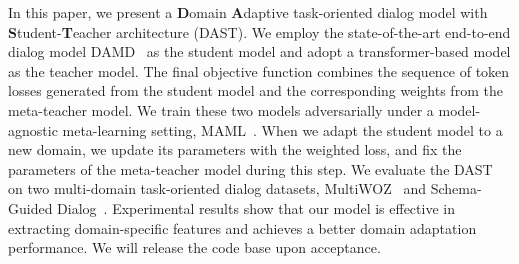 \documentclass[letterpaper]{article} %
\begin{document}
In this paper, we present a \textbf{D}omain \textbf{A}daptive task-oriented dialog model  with \textbf{S}tudent-\textbf{T}eacher architecture (DAST).
%
We employ the state-of-the-art end-to-end dialog model DAMD~\citep{zhang2019task} as the student model and adopt a transformer-based model as the teacher model. 
%
The final objective function combines the sequence of token losses generated from the student model and the corresponding weights from the meta-teacher model.
%
We train these two models adversarially under a model-agnostic meta-learning setting, MAML~\citep{finn2017model}. 
%
When we adapt the student model to a new domain, we update its parameters with the weighted loss, and fix the parameters of the meta-teacher model during this step.
%
We evaluate the DAST on two multi-domain task-oriented dialog datasets,  MultiWOZ~\citep{budzianowski2018multiwoz} and  Schema-Guided Dialog~\citep{rastogi2019towards}. 
%
Experimental results show that our model is effective in extracting domain-specific features and achieves a better domain adaptation performance. 
%
We will release the code base upon acceptance.










\end{document}
